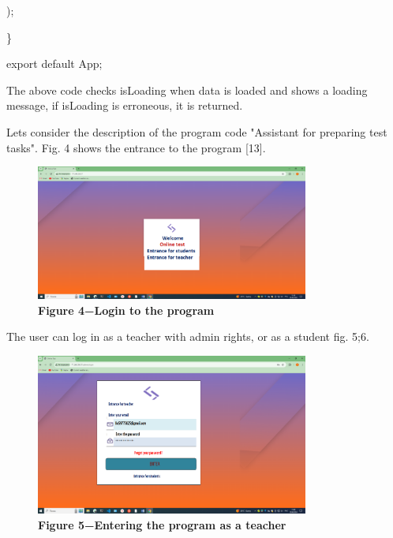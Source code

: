 );

\}

export default App;

\begin{multicols}{2}

The above code checks isLoading when data is loaded and shows a loading
message, if isLoading is erroneous, it is returned.

Let\textquotesingle s consider the description of the program code
"Assistant for preparing test tasks". Fig. 4 shows the entrance to the
program {[}13{]}.
\end{multicols}


\begin{figure}[H]
	\centering
	\includegraphics[width=0.8\textwidth]{assets/129}
	\caption*{\bfseries Figure 4−Login to the program}
\end{figure}
\begin{multicols}{2}

The user can log in as a teacher with admin rights, or as a student fig.
5;6.
\end{multicols}

\begin{figure}[H]
	\centering
	\includegraphics[width=0.8\textwidth]{assets/130}
	\caption*{\bfseries Figure 5−Entering the program as a teacher}
\end{figure}


